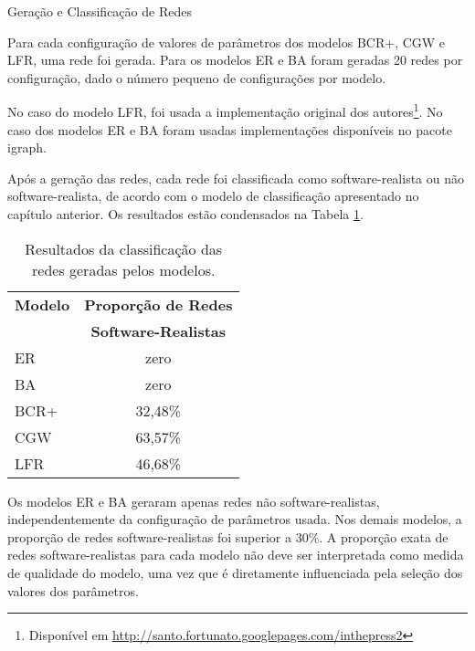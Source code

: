 \begin{section}{Geração e Classificação de Redes}
	
	Para cada configuração de valores de parâmetros dos modelos BCR+, CGW e LFR, uma rede foi gerada. Para os modelos ER e BA foram geradas 20 redes por configuração, dado o número pequeno de configurações por modelo. 
	
	No caso do modelo LFR, foi usada a implementação original dos autores\footnote{Disponível em \url{http://santo.fortunato.googlepages.com/inthepress2}}. No caso dos modelos ER e BA foram usadas implementações disponíveis no pacote igraph\cite{igraph}.
	
	Após a geração das redes, cada rede foi classificada como software-realista ou não software-realista, de acordo com o modelo de classificação apresentado no capítulo anterior. Os resultados estão condensados na Tabela \ref{tab:results}.

	

\begin{table}
\caption{Resultados da classificação das redes geradas pelos modelos.}
\centering
\begin{tabular}{|l|c|}
\hline
\textbf{Modelo} & \textbf{Proporção de Redes} \\ & \textbf{Software-Realistas} \\
\hline 
\hline
ER & zero \\ 
\hline
BA & zero \\ 
\hline
BCR+ & 32,48\% \\ %
\hline
CGW  & 63,57\% \\  %
\hline
LFR  & 46,68\% \\ %
\hline
\end{tabular}
\label{tab:results}
\end{table}

	Os modelos ER e BA geraram apenas redes não software-realistas, independentemente da configuração de parâmetros usada. Nos demais modelos, a proporção de redes software-realistas foi superior a 30\%. A proporção exata de redes software-realistas para cada modelo não deve ser interpretada como medida de qualidade do modelo, uma vez que é diretamente influenciada pela seleção dos valores dos parâmetros.

\end{section}

